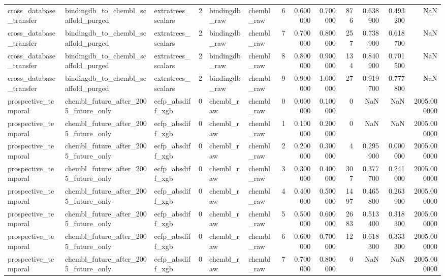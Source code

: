 \begin{longtable}{lllrllrrrrrrr}
cross\_database\_transfer & bindingdb\_to\_chembl\_scaffold\_purged & extratrees\_scalars & 2 & bindingdb\_raw & chembl\_raw & 6 & 0.600000 & 0.700000 & 876 & 0.638900 & 0.493200 & NaN \\
cross\_database\_transfer & bindingdb\_to\_chembl\_scaffold\_purged & extratrees\_scalars & 2 & bindingdb\_raw & chembl\_raw & 7 & 0.700000 & 0.800000 & 257 & 0.738900 & 0.618700 & NaN \\
cross\_database\_transfer & bindingdb\_to\_chembl\_scaffold\_purged & extratrees\_scalars & 2 & bindingdb\_raw & chembl\_raw & 8 & 0.800000 & 0.900000 & 134 & 0.840900 & 0.701500 & NaN \\
cross\_database\_transfer & bindingdb\_to\_chembl\_scaffold\_purged & extratrees\_scalars & 2 & bindingdb\_raw & chembl\_raw & 9 & 0.900000 & 1.000000 & 27 & 0.919700 & 0.777800 & NaN \\
prospective\_temporal & chembl\_future\_after\_2005\_future\_only & ecfp\_absdiff\_xgb & 0 & chembl\_raw & chembl\_raw & 0 & 0.000000 & 0.100000 & 0 & NaN & NaN & 2005.000000 \\
prospective\_temporal & chembl\_future\_after\_2005\_future\_only & ecfp\_absdiff\_xgb & 0 & chembl\_raw & chembl\_raw & 1 & 0.100000 & 0.200000 & 0 & NaN & NaN & 2005.000000 \\
prospective\_temporal & chembl\_future\_after\_2005\_future\_only & ecfp\_absdiff\_xgb & 0 & chembl\_raw & chembl\_raw & 2 & 0.200000 & 0.300000 & 4 & 0.295900 & 0.000000 & 2005.000000 \\
prospective\_temporal & chembl\_future\_after\_2005\_future\_only & ecfp\_absdiff\_xgb & 0 & chembl\_raw & chembl\_raw & 3 & 0.300000 & 0.400000 & 307 & 0.377700 & 0.241000 & 2005.000000 \\
prospective\_temporal & chembl\_future\_after\_2005\_future\_only & ecfp\_absdiff\_xgb & 0 & chembl\_raw & chembl\_raw & 4 & 0.400000 & 0.500000 & 1497 & 0.465800 & 0.263900 & 2005.000000 \\
prospective\_temporal & chembl\_future\_after\_2005\_future\_only & ecfp\_absdiff\_xgb & 0 & chembl\_raw & chembl\_raw & 5 & 0.500000 & 0.600000 & 2683 & 0.513400 & 0.318300 & 2005.000000 \\
prospective\_temporal & chembl\_future\_after\_2005\_future\_only & ecfp\_absdiff\_xgb & 0 & chembl\_raw & chembl\_raw & 6 & 0.600000 & 0.700000 & 12 & 0.618300 & 0.333300 & 2005.000000 \\
prospective\_temporal & chembl\_future\_after\_2005\_future\_only & ecfp\_absdiff\_xgb & 0 & chembl\_raw & chembl\_raw & 7 & 0.700000 & 0.800000 & 0 & NaN & NaN & 2005.000000 \\

\end{longtable}
